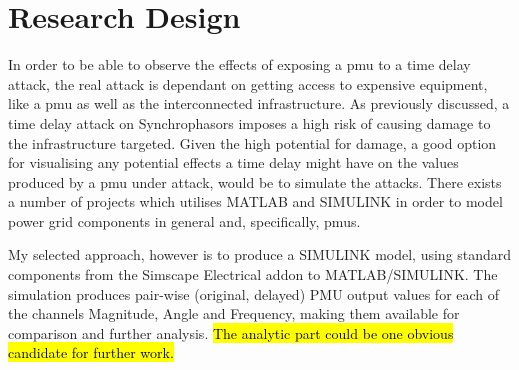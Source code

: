 




\section{Research Design}

In order to be able to observe the effects of exposing a \acrshort{pmu} to a time delay attack, the real attack is dependant on getting access to expensive equipment, like a \acrshort{pmu} as well as the interconnected infrastructure.
As previously discussed, a time delay attack on Synchrophasors imposes a high risk of causing damage to the infrastructure targeted.
Given the high potential for damage, a good option for visualising any potential effects a time delay might have on the values produced by a \acrshort{pmu} under attack, would be to simulate the attacks.
There exists a number of projects which utilises MATLAB and SIMULINK in order to model power grid components in general and, specifically, \acrshort{pmu}s.

My selected approach, however is to produce a SIMULINK model, using standard components from the Simscape Electrical addon to MATLAB/SIMULINK. The simulation produces pair-wise (original, delayed) PMU output values for each of the channels Magnitude, Angle and Frequency, making them available for comparison and further analysis. \hl{The analytic part could be one obvious candidate for further work.}

%




